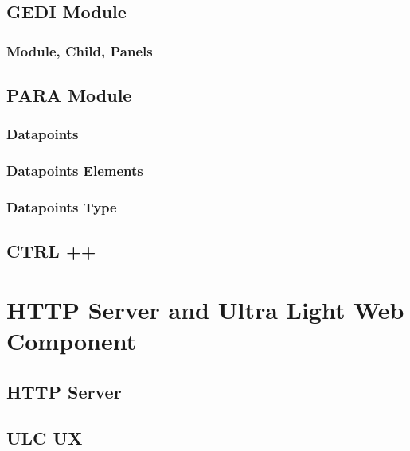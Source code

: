 \documentclass[../main.tex]{subfiles}
\begin{document}
\section{GEDI Module}
\subsection{Module, Child, Panels}

\section{PARA Module}
\subsection{Datapoints}
\subsection{Datapoints Elements}
\subsection{Datapoints Type}

\section{CTRL ++}

\chapter{HTTP Server and Ultra Light Web Component}
\section{HTTP Server}
\section{ULC UX}
\end{document}
